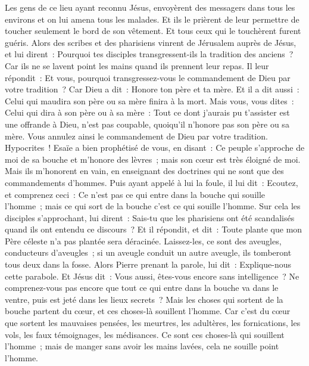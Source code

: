 \begin{multicols}{2}
Les gens de ce lieu ayant reconnu Jésus, envoyèrent des messagers dans tous les environs et on lui amena tous les malades.
Et ils le prièrent de leur permettre de toucher seulement le bord de son vêtement. Et tous ceux qui le touchèrent furent guéris.
\VerseOne{}Alors des scribes et des pharisiens vinrent de Jérusalem auprès de Jésus, et lui dirent~:
Pourquoi tes disciples transgressent-ils la tradition des anciens~? Car ils ne se lavent point les mains quand ils prennent leur repas.
Il leur répondit~: Et vous, pourquoi transgressez-vous le commandement de Dieu par votre tradition~?
Car Dieu a dit~: Honore ton père et ta mère. Et il a dit aussi~: Celui qui maudira son père ou sa mère finira à la mort.
Mais vous, vous dites~: Celui qui dira à son père ou à sa mère~: Tout ce dont j'aurais pu t'assister est une offrande à Dieu, n'est pas coupable, quoiqu'il n'honore pas son père ou sa mère.
Vous annulez ainsi le commandement de Dieu par votre tradition.
Hypocrites~! Esaïe a bien prophétisé de vous, en disant~:
Ce peuple s'approche de moi de sa bouche et m'honore des lèvres~; mais son cœur est très éloigné de moi.
Mais ils m'honorent en vain, en enseignant des doctrines qui ne sont que des commandements d'hommes.
Puis ayant appelé à lui la foule, il lui dit~: Ecoutez, et comprenez ceci~:
Ce n'est pas ce qui entre dans la bouche qui souille l'homme~; mais ce qui sort de la bouche c'est ce qui souille l'homme.
Sur cela les disciples s'approchant, lui dirent~: Sais-tu que les pharisiens ont été scandalisés quand ils ont entendu ce discours~?
Et il répondit, et dit~: Toute plante que mon Père céleste n'a pas plantée sera déracinée.
Laissez-les, ce sont des aveugles, conducteurs d'aveugles~; si un aveugle conduit un autre aveugle, ils tomberont tous deux dans la fosse.
Alors Pierre prenant la parole, lui dit~: Explique-nous cette parabole.
Et Jésus dit~: Vous aussi, êtes-vous encore sans intelligence~?
Ne comprenez-vous pas encore que tout ce qui entre dans la bouche va dans le ventre, puis est jeté dans les lieux secrets~?
Mais les choses qui sortent de la bouche partent du cœur, et ces choses-là souillent l'homme.
Car c'est du cœur que sortent les mauvaises pensées, les meurtres, les adultères, les fornications, les vols, les faux témoignages, les médisances.
Ce sont ces choses-là qui souillent l'homme~; mais de manger sans avoir les mains lavées, cela ne souille point l'homme.

\end{multicols}
